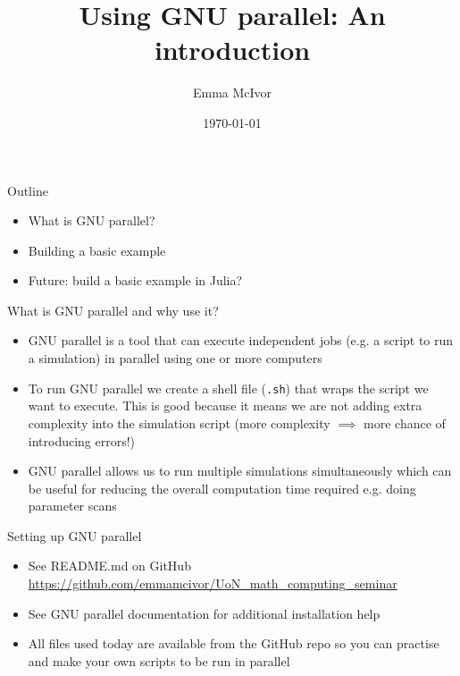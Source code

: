 \documentclass{beamer}
\title[Modelling \ca dynamics]{Using GNU parallel: An introduction}
\author[Emma McIvor]{Emma McIvor}
\institute{University of Nottingham}
\date{\today}
\begin{document}
\begin{frame}
  \titlepage
\end{frame}


\begin{frame}{Outline}
\begin{itemize}
\item What is GNU parallel?
\item Building a basic example
\item Future: build a basic example in Julia?
\end{itemize}
\end{frame}

\begin{frame}{What is GNU parallel and why use it?}
\begin{itemize}
	\item GNU parallel is a tool that can execute independent jobs (e.g. a script to run a simulation) in parallel using one or more computers
	\item To run GNU parallel we create a shell file (\texttt{.sh}) that wraps the script we want to execute. This is good because it means we are not adding extra complexity into the simulation script (more complexity $\implies$ more chance of introducing errors!)
	\item GNU parallel allows us to run multiple simulations simultaneously which can be useful for reducing the overall computation time required e.g. doing parameter scans
\end{itemize}
\end{frame}

\begin{frame}{Setting up GNU parallel}
\begin{itemize}
\item See README.md on GitHub \url{https://github.com/emmamcivor/UoN_math_computing_seminar}
\item See GNU parallel documentation for additional installation help
\item All files used today are available from the GitHub repo so you can practise and make your own scripts to be run in parallel
\end{itemize}
\end{frame}
\end{document}
